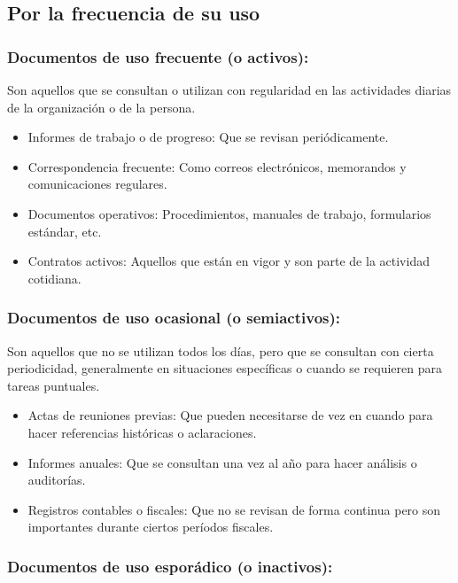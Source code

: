 \documentclass{article}
\begin{document}
\subsection{Por la frecuencia de su uso}

\subsubsection{Documentos de uso frecuente (o activos):}

Son aquellos que se consultan o utilizan con regularidad en las actividades diarias de la organización o de la persona.

\begin{itemize}
    \item   Informes de trabajo o de progreso: Que se revisan periódicamente.
    \item   Correspondencia frecuente: Como correos electrónicos, memorandos y comunicaciones regulares.
    \item   Documentos operativos: Procedimientos, manuales de trabajo, formularios estándar, etc.
    \item   Contratos activos: Aquellos que están en vigor y son parte de la actividad cotidiana.
\end{itemize}

\subsubsection{Documentos de uso ocasional (o semiactivos):}

Son aquellos que no se utilizan todos los días, pero que se consultan con cierta periodicidad, generalmente en situaciones específicas o cuando se requieren para tareas puntuales.

\begin{itemize}
    \item   Actas de reuniones previas: Que pueden necesitarse de vez en cuando para hacer referencias históricas o aclaraciones.
    \item   Informes anuales: Que se consultan una vez al año para hacer análisis o auditorías.
    \item   Registros contables o fiscales: Que no se revisan de forma continua pero son importantes durante ciertos períodos fiscales.
\end{itemize}

\subsubsection{Documentos de uso esporádico (o inactivos):}
\end{document}
